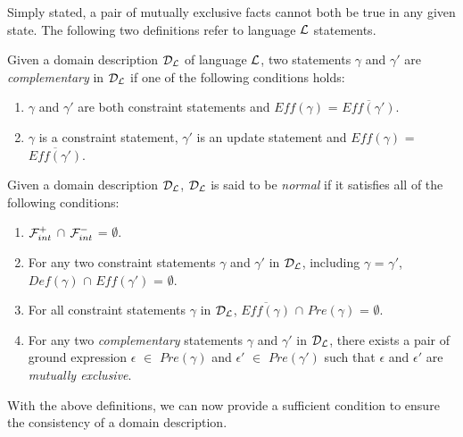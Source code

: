 \documentclass[glov2,twocolumn,final]{svjour2}
\newenvironment{vdefinition}
  {\begin{definition}\hspace{0.1em}}
  {\end{definition}}
\begin{document}
    Simply stated, a pair of mutually exclusive facts cannot both be true
    in any given state. The following two definitions refer to language
    ${\cal L}$ statements.

    \begin{vdefinition}
      \label{def-comp}
      Given a domain description ${\cal D_{L}}$ of language ${\cal L}$,
      two statements $\gamma$ and $\gamma'$ are {\em complementary} in
      ${\cal D_{L}}$ if one of the following conditions holds:
      \begin{enumerate}
        \item
          $\gamma$ and $\gamma'$ are both constraint statements and
          $Eff(\gamma)$ = $\overline{Eff(\gamma')}$.
        \item
          $\gamma$ is a constraint statement, $\gamma'$ is an update
          statement and $Eff(\gamma)$ = $\overline{Eff(\gamma')}$.
      \end{enumerate}
    \end{vdefinition}

    \begin{vdefinition}
      \label{def-norm}
      Given a domain description ${\cal D_{L}}$, ${\cal D_{L}}$ is said to
      be {\em normal} if it satisfies all of the following conditions:
      \begin{enumerate}
        \item
          \label{def-norm-1}
          ${\cal F}^{+}_{int}$ $\cap$ ${\cal F}^{-}_{int}$ = $\emptyset$.
        \item
          \label{def-norm-2}
          For any two constraint statements $\gamma$ and $\gamma'$ in
          ${\cal D_{L}}$, including $\gamma$ = $\gamma'$, $Def(\gamma)$ $\cap$
          $Eff(\gamma')$ = $\emptyset$.
        \item
          \label{def-norm-3}
          For all constraint statements $\gamma$ in ${\cal D_{L}}$,
          $\overline{Eff(\gamma)}$ $\cap$ $Pre(\gamma)$ = $\emptyset$.
        \item
          \label{def-norm-4}
          For any two {\em complementary} statements $\gamma$ and $\gamma'$ in
          ${\cal D_{L}}$, there exists a pair of ground expression $\epsilon$
          $\in$ $Pre(\gamma)$ and $\epsilon'$ $\in$ $Pre(\gamma')$ such that
          $\epsilon$ and $\epsilon'$ are {\em mutually exclusive}.
      \end{enumerate}
    \end{vdefinition}

    With the above definitions, we can now provide a sufficient condition to
    ensure the consistency of a domain description.
\end{document}
